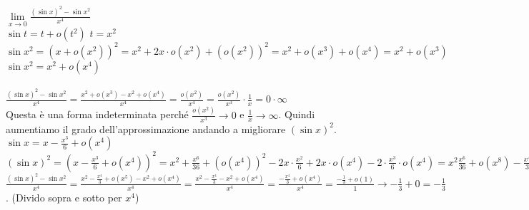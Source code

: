 \begin{example}
$\lim\limits_{x\to 0}\frac{(\sin{x})^2 - \sin{x^2}}{x^4}$\\
$\sin{t} = t + o(t^2)$ \hspace{.5cm} $t= x^2$\\
$\sin{x}^2 = (x + o(x^2))^2 = x^2 + 2x \cdot o(x^2) + (o(x^2))^2 = x^2 + o(x^3) + o(x^4) = x^2 + o(x^3)$ \hspace{.3cm}$\sin{x^2} = x^2 + o(x^4)$\\\\
$\frac{(\sin{x})^2 - \sin{x^2}}{x^4} = \frac{x^2 + o(x^3) - x^2 + o(x^4)}{x^4} = \frac{o(x^2)}{x^4} = \frac{o(x^2)}{x^3} \cdot \frac{1}{x} = 0 \cdot \infty$ \\
Questa è una forma indeterminata perché $\frac{o(x^2)}{x^3} \to 0$ e $\frac{1}{x} \to \infty$. Quindi aumentiamo il grado dell'approssimazione andando a migliorare $(\sin{x})^2$. $\sin{x} = x - \frac{x^3}{6} + o(x^4)$\\
$(\sin{x})^2 = (x - \frac{x^3}{6} + o(x^4))^2 = x^2 + \frac{x^6}{36} + (o(x^4))^2 - 2x \cdot \frac{x^2}{6} + 2x \cdot o(x^4) - 2 \cdot \frac{x^3}{6} \cdot o(x^4) = x^2 \frac{x^6}{36} + o(x^8) -  \frac{x^4}{3} + o(x^5) + o(x^7) = x^2 - \frac{x^4}{3} + o(x^5)$\\
$\frac{(\sin{x})^2 - \sin{x^2}}{x^4} = \frac{x^2 - \frac{x^4}{3} + o(x^5) - x^2 + o(x^4)}{x^4} = \frac{x^2 - \frac{x^4}{3} - x^2 + o(x^4)}{x^4} = \frac{-\frac{x^4}{3} + o(x^4)}{x^4} = \frac{-\frac{1}{3} + o(1)}{1} \to -\frac{1}{3} + 0 = -\frac{1}{3}$. (Divido sopra e sotto per $x^4$)
\end{example}

